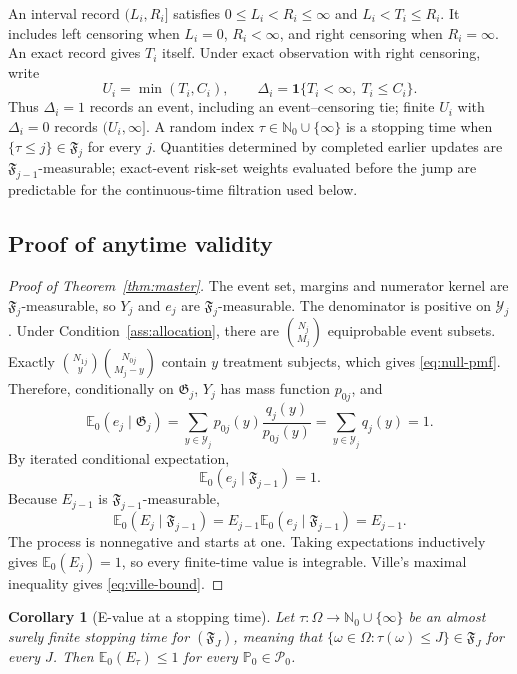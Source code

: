 \documentclass[12pt]{article}
\newtheorem{corollary}[theorem]{Corollary}
\theoremstyle{definition}
\theoremstyle{remark}
\begin{document}
An interval record $(L_i,R_i]$ satisfies $0\leq L_i<R_i\leq\infty$ and $L_i<T_i\leq R_i$. It includes left censoring when $L_i=0$, $R_i<\infty$, and right censoring when $R_i=\infty$. An exact record gives $T_i$ itself. Under exact observation with right censoring, write
\[
 U_i=\min(T_i,C_i),\qquad
 \Delta_i=\mathbf 1\{T_i<\infty,\ T_i\leq C_i\}.
\]
Thus $\Delta_i=1$ records an event, including an event--censoring tie; finite $U_i$ with $\Delta_i=0$ records $(U_i,\infty]$. A random index $\tau\in\mathbb N_0\cup\{\infty\}$ is a stopping time when $\{\tau\leq j\}\in\mathfrak F_j$ for every $j$. Quantities determined by completed earlier updates are $\mathfrak F_{j-1}$-measurable; exact-event risk-set weights evaluated before the jump are predictable for the continuous-time filtration used below.


\subsection{Proof of anytime validity}

\begin{proof}[Proof of Theorem~\ref{thm:master}]
The event set, margins and numerator kernel are $\mathfrak F_j$-measurable, so $Y_j$ and $e_j$ are $\mathfrak F_j$-measurable. The denominator is positive on $\mathcal Y_j$.
Under Condition~\ref{ass:allocation}, there are $\binom{N_j}{M_j}$ equiprobable event subsets. Exactly $\binom{N_{1j}}{y}\binom{N_{0j}}{M_j-y}$ contain $y$ treatment subjects, which gives \eqref{eq:null-pmf}. Therefore, conditionally on $\mathfrak G_j$, $Y_j$ has mass function $p_{0j}$, and
\[
 \mathbb E_0\left(e_j\mid\mathfrak G_j\right)
 =\sum_{y\in\mathcal Y_j}p_{0j}(y)\frac{q_j(y)}{p_{0j}(y)}
 =\sum_{y\in\mathcal Y_j}q_j(y)=1.
\]
By iterated conditional expectation,
\[
 \mathbb E_0\left(e_j\mid\mathfrak F_{j-1}\right)=1.
\]
Because $E_{j-1}$ is $\mathfrak F_{j-1}$-measurable,
\[
 \mathbb E_0\left(E_j\mid\mathfrak F_{j-1}\right)
 =E_{j-1}\mathbb E_0\left(e_j\mid\mathfrak F_{j-1}\right)=E_{j-1}.
\]
The process is nonnegative and starts at one. Taking expectations inductively gives $\mathbb E_0(E_j)=1$, so every finite-time value is integrable. Ville's maximal inequality gives \eqref{eq:ville-bound}.
\end{proof}

\begin{corollary}[E-value at a stopping time]
\label{cor:app-stopping}
Let $\tau:\Omega\to\mathbb N_0\cup\{\infty\}$ be an almost surely finite stopping time for $(\mathfrak F_J)$, meaning that $\{\omega\in\Omega:\tau(\omega)\leq J\}\in\mathfrak F_J$ for every $J$. Then $\mathbb E_0(E_\tau)\leq1$ for every $\mathbb P_0\in\mathcal P_0$.
\end{corollary}
\end{document}
